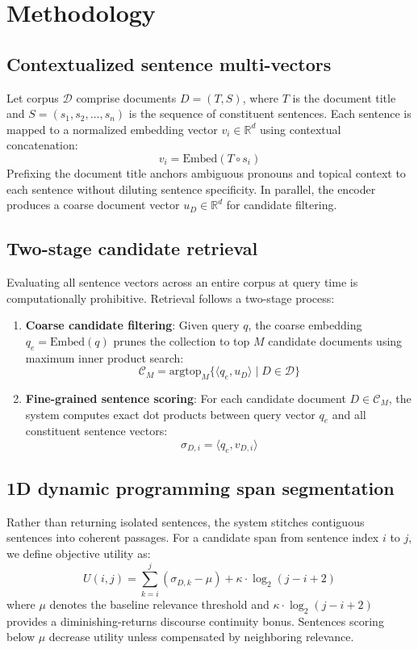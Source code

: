 \documentclass[preprint,12pt]{article}
\begin{document}
\section{Methodology}

\subsection{Contextualized sentence multi-vectors}
Let corpus $\mathcal{D}$ comprise documents $D = (T, S)$, where $T$ is the document title and $S = (s_1, s_2, \dots, s_n)$ is the sequence of constituent sentences. Each sentence is mapped to a normalized embedding vector $v_i \in \mathbb{R}^d$ using contextual concatenation:
\begin{equation}
v_i = \text{Embed}(T \circ s_i)
\end{equation}
Prefixing the document title anchors ambiguous pronouns and topical context to each sentence without diluting sentence specificity. In parallel, the encoder produces a coarse document vector $u_D \in \mathbb{R}^d$ for candidate filtering.

\subsection{Two-stage candidate retrieval}
Evaluating all sentence vectors across an entire corpus at query time is computationally prohibitive. Retrieval follows a two-stage process:
\begin{enumerate}
    \item \textbf{Coarse candidate filtering}: Given query $q$, the coarse embedding $q_e = \text{Embed}(q)$ prunes the collection to top $M$ candidate documents using maximum inner product search:
    \begin{equation}
    \mathcal{C}_M = \text{argtop}_M \{ \langle q_e, u_D \rangle \mid D \in \mathcal{D} \}
    \end{equation}
    \item \textbf{Fine-grained sentence scoring}: For each candidate document $D \in \mathcal{C}_M$, the system computes exact dot products between query vector $q_e$ and all constituent sentence vectors:
    \begin{equation}
    \sigma_{D, i} = \langle q_e, v_{D, i} \rangle
    \end{equation}
\end{enumerate}

\subsection{1D dynamic programming span segmentation}
Rather than returning isolated sentences, the system stitches contiguous sentences into coherent passages. For a candidate span from sentence index $i$ to $j$, we define objective utility as:
\begin{equation}
U(i, j) = \sum_{k=i}^j (\sigma_{D, k} - \mu) + \kappa \cdot \log_2(j - i + 2)
\end{equation}
where $\mu$ denotes the baseline relevance threshold and $\kappa \cdot \log_2(j - i + 2)$ provides a diminishing-returns discourse continuity bonus. Sentences scoring below $\mu$ decrease utility unless compensated by neighboring relevance.
\end{document}
